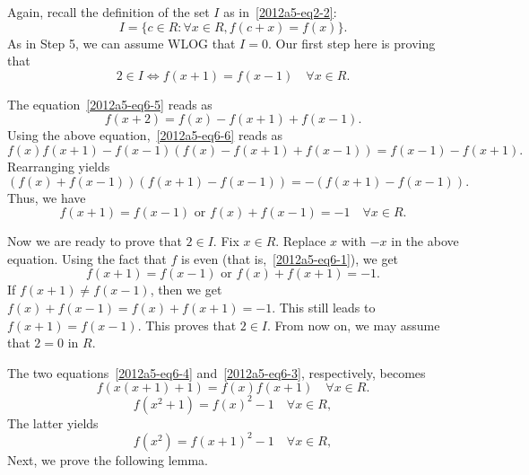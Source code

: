 \documentclass{article}
\begin{document}
Again, recall the definition of the set $I$ as in~\eqref{2012a5-eq2-2}:
\[ I = \{c \in R : \forall x \in R, f(c + x) = f(x)\}. \]
As in Step 5, we can assume WLOG that $I = 0$.
Our first step here is proving that
\[ 2 \in I \iff f(x + 1) = f(x - 1) \quad \forall x \in R. \]

The equation~\eqref{2012a5-eq6-5} reads as
\[ f(x + 2) = f(x) - f(x + 1) + f(x - 1). \]
Using the above equation,~\eqref{2012a5-eq6-6} reads as
\[ f(x) f(x + 1) - f(x - 1) (f(x) - f(x + 1) + f(x - 1)) = f(x - 1) - f(x + 1). \]
Rearranging yields
\[ (f(x) + f(x - 1))(f(x + 1) - f(x - 1)) = -(f(x + 1) - f(x - 1)). \]
Thus, we have
\[ f(x + 1) = f(x - 1) \text{ or } f(x) + f(x - 1) = -1 \quad \forall x \in R. \]

Now we are ready to prove that $2 \in I$.
Fix $x \in R$.
Replace $x$ with $-x$ in the above equation.
Using the fact that $f$ is even (that is,~\eqref{2012a5-eq6-1}), we get
\[ f(x + 1) = f(x - 1) \text{ or } f(x) + f(x + 1) = -1. \]
If $f(x + 1) \neq f(x - 1)$, then we get $f(x) + f(x - 1) = f(x) + f(x + 1) = -1$.
This still leads to $f(x + 1) = f(x - 1)$.
This proves that $2 \in I$.
From now on, we may assume that $2 = 0$ in $R$.

The two equations~\eqref{2012a5-eq6-4} and~\eqref{2012a5-eq6-3}, respectively, becomes
\[ f(x(x + 1) + 1) = f(x) f(x + 1) \quad \forall x \in R. \tag{10.1}\label{2012a5-eq10-1} \]
\[ f(x^2 + 1) = f(x)^2 - 1 \quad \forall x \in R, \tag{10.2}\label{2012a5-eq10-2} \]
The latter yields
\[ f(x^2) = f(x + 1)^2 - 1  \quad \forall x \in R, \tag{10.3}\label{2012a5-eq10-3} \]
Next, we prove the following lemma.
\end{document}
